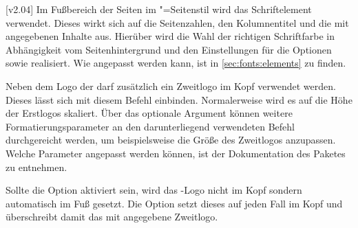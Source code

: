 \begin{DeclareEntity*}{}
\begin{DeclareEntity*}{}
\begin{DeclareEntity*}{}
\begin{Declaration}
  {}
  [v2.04]
Im Fußbereich der Seiten im "=Seitenstil wird das 
Schriftelement~ verwendet. Dieses wirkt sich auf die 
Seitenzahlen, den Kolumnentitel und die mit  angegebenen 
Inhalte aus. Hierüber wird die Wahl der richtigen Schriftfarbe in Abhängigkeit 
vom Seitenhintergrund und den Einstellungen für die Optionen  
sowie  realisiert. Wie  angepasst werden 
kann, ist in \autoref{sec:fonts:elements} zu finden.
\end{Declaration}

\begin{Declaration}
  {}
Neben dem Logo der \TnUD darf zusätzlich ein Zweitlogo im Kopf verwendet 
werden. Dieses lässt sich mit diesem Befehl einbinden. Normalerweise wird es 
auf die Höhe der Erstlogos skaliert. Über das optionale Argument können weitere 
Formatierungsparameter an den darunterliegend verwendeten Befehl 
 durchgereicht werden, um beispielsweise die Größe des 
Zweitlogos anzupassen. Welche Parameter angepasst werden können, ist der 
Dokumentation des Paketes  zu entnehmen.

Sollte die Option  aktiviert sein, wird das \DDC-Logo nicht im Kopf 
sondern automatisch im Fuß gesetzt. Die Option  setzt dieses 
auf jeden Fall im Kopf und überschreibt damit das mit  
angegebene Zweitlogo.
\end{Declaration}


\end{DeclareEntity*}
\end{DeclareEntity*}
\end{DeclareEntity*}
